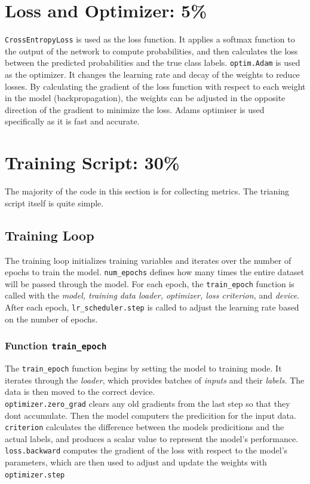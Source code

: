 \documentclass[12pt]{article}
\begin{document}
\section{Loss and Optimizer: 5\%}
\texttt{CrossEntropyLoss} is used as the loss function. It applies a softmax function to the output of the network to compute probabilities, and then calculates the loss between the predicted probabilities and the true class labels. \texttt{optim.Adam} is used as the optimizer. It changes the learning rate and decay of the weights to reduce losses. By calculating the gradient of the loss function with respect to each weight in the model (backpropagation), the weights can be adjusted in the opposite direction of the gradient to minimize the loss. Adams optimiser is used specifically as it is fast and accurate.

\section{Training Script: 30\%}
The majority of the code in this section is for collecting metrics. The trianing script itself is quite simple. 

\subsection{Training Loop}
The training loop initializes training variables and iterates over the number of epochs to train the model. \texttt{num\_epochs} defines how many times the entire dataset will be passed through the model. For each epoch, the \texttt{train\_epoch} function is called with the \textit{model, training data loader, optimizer, loss criterion,} and \textit{device}. After each epoch, \texttt{lr\_scheduler.step} is called to adjust the learning rate based on the number of epochs.

\subsubsection{Function \texttt{train\_epoch}}
The \texttt{train\_epoch} function begins by setting the model to training mode. It iterates through the \textit{loader}, which provides batches of \textit{inputs} and their \textit{labels}. The data is then moved to the correct device.\\ \texttt{optimizer.zero\_grad} clears any old gradients from the last step so that they dont accumulate. Then the model computers the predicition for the input data. \texttt{criterion} calculates the difference between the models predicitions and the actual labels, and produces a scalar value to represent the model's performance. \texttt{loss.backward} computes the gradient of the loss with respect to the model's parameters, which are then used to adjust and update the weights with \texttt{optimizer.step}
\end{document}
